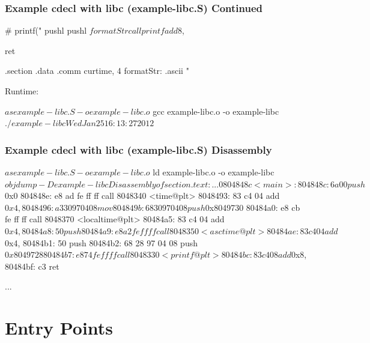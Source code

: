 \documentclass[11pt,xcolor=dvipsnames]{beamer}
\newcommand{\mvs}{\vspace{-0.95em}}
\begin{document}
\begin{frame}[fragile,t]
\mvs
\frametitle{Example {\ttfamily cdecl} with libc (example-libc.S) Continued}
\begin{gascode}
  # printf("%
  pushl %
  pushl $formatStr
  call printf
  add $8, %

  ret

.section .data
  .comm curtime, 4
  formatStr:  .ascii "%
\end{gascode}
{\small Runtime:}
\begin{textcode}
$ as example-libc.S -o example-libc.o
$ gcc example-libc.o -o example-libc
$ ./example-libc
Wed Jan 25 16:13:27 2012
$
\end{textcode}
\end{frame}

\begin{frame}[fragile,t]
\frametitle{Example {\ttfamily cdecl} with libc (example-libc.S) Disassembly}
\mvs
\begin{customobjdumpcode}
$ as example-libc.S -o example-libc.o
$ ld example-libc.o -o example-libc
$ objdump -D example-libc

Disassembly of section .text:
...
0804848c <main>:
 804848c:   6a 00                   push   $0x0
 804848e:   e8 ad fe ff ff          call   8048340 <time@plt>
 8048493:   83 c4 04                add    $0x4,%
 8048496:   a3 30 97 04 08          mov    %
 804849b:   68 30 97 04 08          push   $0x8049730
 80484a0:   e8 cb fe ff ff          call   8048370 <localtime@plt>
 80484a5:   83 c4 04                add    $0x4,%
 80484a8:   50                      push   %
 80484a9:   e8 a2 fe ff ff          call   8048350 <asctime@plt>
 80484ae:   83 c4 04                add    $0x4,%
 80484b1:   50                      push   %
 80484b2:   68 28 97 04 08          push   $0x8049728
 80484b7:   e8 74 fe ff ff          call   8048330 <printf@plt>
 80484bc:   83 c4 08                add    $0x8,%
 80484bf:   c3                      ret    

...
\end{customobjdumpcode}
\end{frame}

\section{Entry Points}
\end{document}
